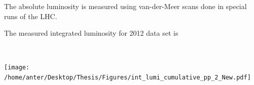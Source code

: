 \documentclass{beamer}
\begin{document}
\begin{frame}
\begin{minipage}[thbp]{0.53\textwidth}
\begin{itemize}
{\vspace{0.5mm}
\item The absolute luminosity is measured using van-der-Meer scans done in special runs of the LHC. 
\vspace{0.5mm}
\item The measured integrated luminosity for 2012 data set is \\}
\item[] 
\end{itemize}
{\tiny {}\\}
\end{minipage}
\begin{minipage}[thbp]{0.33\textwidth}
\vspace{1mm}
\texttt{[image: /home/anter/Desktop/Thesis/Figures/int\_lumi\_cumulative\_pp\_2\_New.pdf]}\\
\end{minipage}\\
\end{frame}

\begin{frame}
\begin{center}
\vspace{13mm}
\textbf{\Large{}}
\end{center}
\end{frame}
\end{document}
